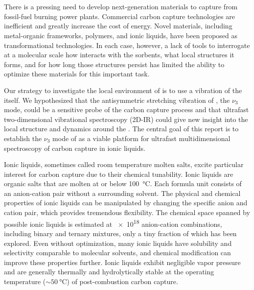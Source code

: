 \documentclass[%
  class = book,%
  crop = false,%
  float = true,%
  multi = true,%
  preview = false,%
]{standalone}
\begin{document}
\section{\texorpdfstring{}{Introduction}}
\label{sec:anions_intro}

There is a pressing need to develop next-generation materials to capture  from fossil-fuel burning power plants. Commercial carbon capture technologies are inefficient and greatly increase the cost of energy\cite{Bhown2011}. Novel materials, including metal-organic frameworks,\cite{millwardJACS-05,sumidaCR-12} polymers,\cite{Du2011,Dawson2011} and ionic liquids,\cite{batesJACS-02,Karadas2010,baraACR-10} have been proposed as transformational technologies. In each case, however, a lack of tools to interrogate at a molecular scale how  interacts with the sorbents, what local structures it forms, and for how long those structures persist has limited the ability to optimize these materials for this important task.

Our strategy to investigate the local environment of  is to use a vibration of the  itself. We hypothesized that the antisymmetric stretching vibration of , the \(\nu_3\) mode, could be a sensitive probe of the carbon capture process and that ultrafast two-dimensional vibrational spectroscopy (2D-IR) could give new insight into the local structure and dynamics around the . The central goal of this report is to establish the \(\nu_3\) mode of  as a viable platform for ultrafast multidimensional spectroscopy of carbon capture in ionic liquids.

Ionic liquids, sometimes called room temperature molten salts, excite particular interest for carbon capture due to their chemical tunability. Ionic liquids are organic salts that are molten at or below \SI{100}{\celsius}. Each formula unit consists of an anion-cation pair without a surrounding solvent. The physical and chemical properties of ionic liquids can be manipulated by changing the specific anion and cation pair, which provides tremendous flexibility. The chemical space spanned by possible ionic liquids is estimated at \num{e18} anion-cation combinations, including binary and ternary mixtures,\cite{Holbrey1999} only a tiny fraction of which has been explored. Even without optimization, many ionic liquids have  solubility and selectivity comparable to molecular solvents,\cite{Bara2009,Cadena2004} and chemical modification can improve these properties further.\cite{Gurkan2010,seoJPCB-14} Ionic liquids exhibit negligible vapor pressure and are generally thermally and hydrolytically stable at the operating temperature (\(\sim \SI{50}{\celsius}\)) of post-combustion carbon capture.
\end{document}
